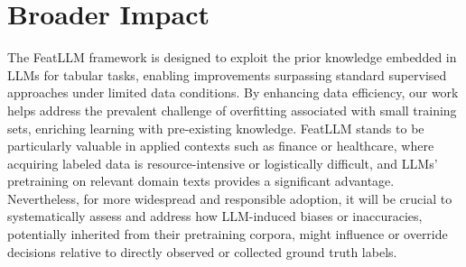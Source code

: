 \section{Broader Impact} The \textsf{FeatLLM} framework is designed to exploit the prior knowledge embedded in LLMs for tabular tasks, enabling improvements surpassing standard supervised approaches under limited data conditions. By enhancing data efficiency, our work helps address the prevalent challenge of overfitting associated with small training sets, enriching learning with pre-existing knowledge. \textsf{FeatLLM} stands to be particularly valuable in applied contexts such as finance or healthcare, where acquiring labeled data is resource-intensive or logistically difficult, and LLMs’ pretraining on relevant domain texts provides a significant advantage. Nevertheless, for more widespread and responsible adoption, it will be crucial to systematically assess and address how LLM-induced biases or inaccuracies, potentially inherited from their pretraining corpora, might influence or override decisions relative to directly observed or collected ground truth labels.


